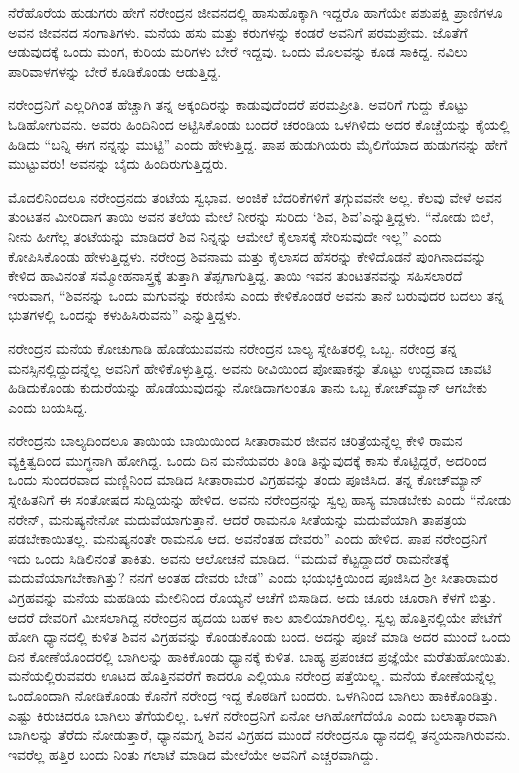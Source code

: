 ನೆರೆಹೊರೆಯ ಹುಡುಗರು ಹೇಗೆ ನರೇಂದ್ರನ ಜೀವನದಲ್ಲಿ ಹಾಸುಹೊಕ್ಕಾಗಿ ಇದ್ದರೊ ಹಾಗೆಯೇ ಪಶುಪಕ್ಷಿ ಪ್ರಾಣಿಗಳೂ ಅವನ ಜೀವನದ ಸಂಗಾತಿಗಳು. ಮನೆಯ ಹಸು ಮತ್ತು ಕರುಗಳನ್ನು ಕಂಡರೆ ಅವನಿಗೆ ಪರಮಪ್ರೇಮ. ಜೊತೆಗೆ ಆಡುವುದಕ್ಕೆ ಒಂದು ಮಂಗ, ಕುರಿಯ ಮರಿಗಳು ಬೇರೆ ಇದ್ದವು. ಒಂದು ಮೊಲವನ್ನು ಕೂಡ ಸಾಕಿದ್ದ. ನವಿಲು ಪಾರಿವಾಳಗಳನ್ನು ಬೇರೆ ಕೂಡಿಕೊಂಡು ಆಡುತ್ತಿದ್ದ. 

ನರೇಂದ್ರನಿಗೆ ಎಲ್ಲರಿಗಿಂತ ಹೆಚ್ಚಾಗಿ ತನ್ನ ಅಕ್ಕಂದಿರನ್ನು ಕಾಡುವುದೆಂದರೆ ಪರಮಪ್ರೀತಿ. ಅವರಿಗೆ ಗುದ್ದು ಕೊಟ್ಟು ಓಡಿಹೋಗುವನು. ಅವರು ಹಿಂದಿನಿಂದ ಅಟ್ಟಿಸಿಕೊಂಡು ಬಂದರೆ ಚರಂಡಿಯ ಒಳಗಿಳಿದು ಅದರ ಕೊಚ್ಚೆಯನ್ನು ಕೈಯಲ್ಲಿ ಹಿಡಿದು “ಬನ್ನಿ ಈಗ ನನ್ನನ್ನು ಮುಟ್ಟಿ” ಎಂದು ಹೇಳುತ್ತಿದ್ದ. ಪಾಪ ಹುಡುಗಿಯರು ಮೈಲಿಗೆಯಾದ ಹುಡುಗನನ್ನು ಹೇಗೆ ಮುಟ್ಟುವರು! ಅವನನ್ನು ಬೈದು ಹಿಂದಿರುಗುತ್ತಿದ್ದರು. 

ಮೊದಲಿನಿಂದಲೂ ನರೇಂದ್ರನದು ತಂಟೆಯ ಸ್ವಭಾವ. ಅಂಜಿಕೆ ಬೆದರಿಕೆಗಳಿಗೆ ತಗ್ಗುವವನೇ ಅಲ್ಲ. ಕೆಲವು ವೇಳೆ ಅವನ ತುಂಟತನ ಮೀರಿದಾಗ ತಾಯಿ ಅವನ ತಲೆಯ ಮೇಲೆ ನೀರನ್ನು ಸುರಿದು ‘ಶಿವ, ಶಿವ’ಎನ್ನುತ್ತಿದ್ದಳು. “ನೋಡು ಬಿಲೆ, ನೀನು ಹೀಗೆಲ್ಲ ತಂಟೆಯನ್ನು ಮಾಡಿದರೆ ಶಿವ ನಿನ್ನನ್ನು ಆಮೇಲೆ ಕೈಲಾಸಕ್ಕೆ ಸೇರಿಸುವುದೇ ಇಲ್ಲ” ಎಂದು ಕೋಪಿಸಿಕೊಂಡು ಹೇಳುತ್ತಿದ್ದಳು. ನರೇಂದ್ರ ಶಿವನಾಮ ಮತ್ತು ಕೈಲಾಸದ ಹೆಸರನ್ನು ಕೇಳಿದೊಡನೆ ಪುಂಗಿನಾದವನ್ನು ಕೇಳಿದ ಹಾವಿನಂತೆ ಸಮ್ಮೋಹನಾಸ್ತ್ರಕ್ಕೆ ತುತ್ತಾಗಿ ತೆಪ್ಪಗಾಗುತ್ತಿದ್ದ. ತಾಯಿ ಇವನ ತುಂಟತನವನ್ನು ಸಹಿಸಲಾರದೆ ಇರುವಾಗ, “ಶಿವನನ್ನು ಒಂದು ಮಗುವನ್ನು ಕರುಣಿಸು ಎಂದು ಕೇಳಿಕೊಂಡರೆ ಅವನು ತಾನೆ ಬರುವುದರ ಬದಲು ತನ್ನ ಭುತಗಳಲ್ಲಿ ಒಂದನ್ನು ಕಳುಹಿಸಿರುವನು” ಎನ್ನುತ್ತಿದ್ದಳು. 

ನರೇಂದ್ರನ ಮನೆಯ ಕೋಚುಗಾಡಿ ಹೊಡೆಯುವವನು ನರೇಂದ್ರನ ಬಾಲ್ಯ ಸ್ನೇಹಿತರಲ್ಲಿ ಒಬ್ಬ. ನರೇಂದ್ರ ತನ್ನ ಮನಸ್ಸಿನಲ್ಲಿದ್ದುದನ್ನೆಲ್ಲ ಅವನಿಗೆ ಹೇಳಿಕೊಳ್ಳುತ್ತಿದ್ದ. ಅವನು ಠೀವಿಯಿಂದ ಪೋಷಾಕನ್ನು ತೊಟ್ಟು ಉದ್ದವಾದ ಚಾವಟಿ ಹಿಡಿದುಕೊಂಡು ಕುದುರೆಯನ್ನು ಹೊಡೆಯುವುದನ್ನು ನೋಡಿದಾಗಲಂತೂ ತಾನು ಒಬ್ಬ ಕೋಚ್‍ಮ್ಯಾನ್ ಆಗಬೇಕು ಎಂದು ಬಯಸಿದ್ದ. 

ನರೇಂದ್ರನು ಬಾಲ್ಯದಿಂದಲೂ ತಾಯಿಯ ಬಾಯಿಯಿಂದ ಸೀತಾರಾಮರ ಜೀವನ ಚರಿತ್ರೆಯನ್ನೆಲ್ಲ ಕೇಳಿ ರಾಮನ ವ್ಯಕ್ತಿತ್ವದಿಂದ ಮುಗ್ಧನಾಗಿ ಹೋಗಿದ್ದ. ಒಂದು ದಿನ ಮನೆಯವರು ತಿಂಡಿ ತಿನ್ನುವುದಕ್ಕೆ ಕಾಸು ಕೊಟ್ಟಿದ್ದರೆ, ಅದರಿಂದ ಒಂದು ಸುಂದರವಾದ ಮಣ್ಣಿನಿಂದ ಮಾಡಿದ ಸೀತಾರಾಮರ ವಿಗ್ರಹವನ್ನು ತಂದು ಪೂಜಿಸಿದ. ತನ್ನ ಕೋಚ್‍ಮ್ಯಾನ್ ಸ್ನೇಹಿತನಿಗೆ ಈ ಸಂತೋಷದ ಸುದ್ದಿಯನ್ನು ಹೇಳಿದ. ಅವನು ನರೇಂದ್ರನನ್ನು ಸ್ವಲ್ಪ ಹಾಸ್ಯ ಮಾಡಬೇಕು ಎಂದು “ನೋಡು ನರೇನ್, ಮನುಷ್ಯನೇನೋ ಮದುವೆಯಾಗುತ್ತಾನೆ. ಆದರೆ ರಾಮನೂ ಸೀತೆಯನ್ನು ಮದುವೆಯಾಗಿ ತಾಪತ್ರಯ ಪಡಬೇಕಾಯಿತಲ್ಲ. ಮನುಷ್ಯನಂತೇ ರಾಮನೂ ಆದ. ಅವನೆಂತಹ ದೇವರು” ಎಂದು ಹೇಳಿದ. ಪಾಪ ನರೇಂದ್ರನಿಗೆ ಇದು ಒಂದು ಸಿಡಿಲಿನಂತೆ ತಾಕಿತು. ಅವನು ಆಲೋಚನೆ ಮಾಡಿದ. “ಮದುವೆ ಕೆಟ್ಟದ್ದಾದರೆ ರಾಮನೇತಕ್ಕೆ ಮದುವೆಯಾಗಬೇಕಾಗಿತ್ತು? ನನಗೆ ಅಂತಹ ದೇವರು ಬೇಡ” ಎಂದು ಭಯಭಕ್ತಿಯಿಂದ ಪೂಜಿಸಿದ ಶ‍್ರೀ ಸೀತಾರಾಮರ ವಿಗ್ರಹವನ್ನು ಮನೆಯ ಮಹಡಿಯ ಮೇಲಿನಿಂದ ರೊಯ್ಯನೆ ಆಚೆಗೆ ಬಿಸಾಡಿದ. ಅದು ಚೂರು ಚೂರಾಗಿ ಕೆಳಗೆ ಬಿತ್ತು. ಆದರೆ ದೇವರಿಗೆ ಮೀಸಲಾಗಿದ್ದ ನರೇಂದ್ರನ ಹೃದಯ ಬಹಳ ಕಾಲ ಖಾಲಿಯಾಗಿರಲಿಲ್ಲ. ಸ್ವಲ್ಪ ಹೊತ್ತಿನಲ್ಲಿಯೇ ಪೇಟೆಗೆ ಹೋಗಿ ಧ್ಯಾನದಲ್ಲಿ ಕುಳಿತ ಶಿವನ ವಿಗ್ರಹವನ್ನು ಕೊಂಡುಕೊಂಡು ಬಂದ. ಅದನ್ನು ಪೂಜೆ ಮಾಡಿ ಅದರ ಮುಂದೆ ಒಂದು ದಿನ ಕೋಣೆಯೊಂದರಲ್ಲಿ ಬಾಗಿಲನ್ನು ಹಾಕಿಕೊಂಡು ಧ್ಯಾನಕ್ಕೆ ಕುಳಿತ. ಬಾಹ್ಯ ಪ್ರಪಂಚದ ಪ್ರಜ್ಞೆಯೇ ಮರೆತುಹೋಯಿತು. ಮನೆಯಲ್ಲಿರುವವರು ಊಟದ ಹೊತ್ತಿನವರೆಗೆ ಕಾದರೂ ಎಲ್ಲಿಯೂ ನರೇಂದ್ರ ಪತ್ತೆಯಿಲ್ಲ್ಲ. ಮನೆಯ ಕೋಣೆಯನ್ನೆಲ್ಲ ಒಂದೊಂದಾಗಿ ನೋಡಿಕೊಂಡು ಕೊನೆಗೆ ನರೇಂದ್ರ ಇದ್ದ ಕೊಠಡಿಗೆ ಬಂದರು. ಒಳಗಿನಿಂದ ಬಾಗಿಲು ಹಾಕಿಕೊಂಡಿತ್ತು. ಎಷ್ಟು ಕಿರುಚಿದರೂ ಬಾಗಿಲು ತೆಗೆಯಲಿಲ್ಲ. ಒಳಗೆ ನರೇಂದ್ರನಿಗೆ ಏನೋ ಆಗಿಹೋಗೆದೆಯೊ ಎಂದು ಬಲಾತ್ಕಾರವಾಗಿ ಬಾಗಿಲನ್ನು ತೆರೆದು ನೋಡುತ್ತಾರೆ, ಧ್ಯಾನಮಗ್ನ ಶಿವನ ವಿಗ್ರಹದ ಮುಂದೆ ನರೇಂದ್ರನೂ ಧ್ಯಾನದಲ್ಲಿ ತನ್ಮಯನಾಗಿರುವನು. ಇವರೆಲ್ಲ ಹತ್ತಿರ ಬಂದು ನಿಂತು ಗಲಾಟೆ ಮಾಡಿದ ಮೇಲೆಯೇ ಅವನಿಗೆ ಎಚ್ಚರವಾಗಿದ್ದು. 

